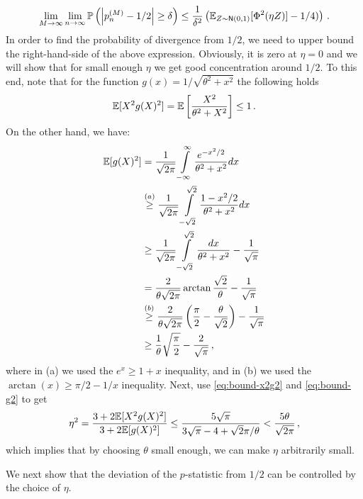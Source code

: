 \documentclass[11pt]{article}
\def\normal{\mathsf{N}}
\begin{document}
\begin{equation}\label{eq: tmp5}
\lim\limits_{M\rightarrow \infty}\lim\limits_{n\rightarrow \infty}^{}\prob\left(\left|  p^{(M)}_n -1/2 \right| \geq \delta \right) \leq  \frac{1}{\delta^2} \left(  \E_{Z\sim\normal(0,1)}[\Phi^2(\eta Z)] -1/4) \right)\,.
\end{equation}
In order to find the probability of divergence from $1/2$, we need to upper bound  the right-hand-side of the above expression. Obviously, it is zero at $\eta=0$ and we will show that for small enough $\eta$ we get good concentration around $1/2$.  To this end, note that for the function $g(x)=1/\sqrt{\theta^2+x^2}$ the following holds
\begin{equation}\label{eq:bound-x2g2}
{\mathbb E}[X^2g(X)^2]={\mathbb E}\left[ \frac{X^2}{\theta^2+X^2} \right]\leq 1\,.
\end{equation}
On the other hand, we have:
\begin{align}
{\mathbb E}[g(X)^2]&=\frac{1}{\sqrt{2\pi}}\int\limits_{-\infty}^{\infty} \frac{e^{-x^2/2}}{\theta^2+x^2}dx \nonumber\\
&\overset{(a)}{\geq} \frac{1}{\sqrt{2\pi}}\int\limits_{-\sqrt{2}}^{\sqrt{2}} \frac{1-x^2/2}{\theta^2+x^2}dx\nonumber\\ 
&\geq \frac{1}{\sqrt{2\pi}}\int\limits_{-\sqrt{2}}^{\sqrt{2}} \frac{dx}{\theta^2+x^2} -{\frac{1}{\sqrt{\pi}}}\nonumber\\ 
&=\frac{2}{\theta\sqrt{2\pi}}\arctan\frac{\sqrt{2}}{\theta}-{\frac{1}{\sqrt{\pi}}}\nonumber\\
&\overset{(b)}{\geq} \frac{2}{\theta\sqrt{2\pi}} \left(  \frac{\pi}{2}-\frac{\theta}{\sqrt{2}} \right)  -{\frac{1}{\sqrt{\pi}}}\nonumber\\
&\geq \frac{1}{\theta}\sqrt{\frac{\pi}{2}} -\frac{2}{\sqrt{\pi}}\label{eq:bound-g2} \,,
\end{align}
where in (a) we used the $e^x\geq 1+x$ inequality, and in (b) we used the $\arctan(x)\geq \pi/2-1/x$ inequality. Next, 
use \eqref{eq:bound-x2g2} and \eqref{eq:bound-g2} to get
%
\begin{equation}\label{eq:eta-upper}
\eta^2 = \frac{3+2{\mathbb E}[X^2g(X)^2]}{3+2{\mathbb E}[g(X)^2]} \leq \frac{5\sqrt{\pi}}{3\sqrt{\pi}-{4} +{\sqrt{2}\pi}/{\theta} } < \frac{5\theta}{\sqrt{2\pi}}\,,
\end{equation}
which implies that by choosing $\theta$ small enough, we can make $\eta$ arbitrarily small. 

We next show that the deviation of the $p$-statistic from $1/2$ can be controlled by the choice of $\eta$. 
\end{document}

